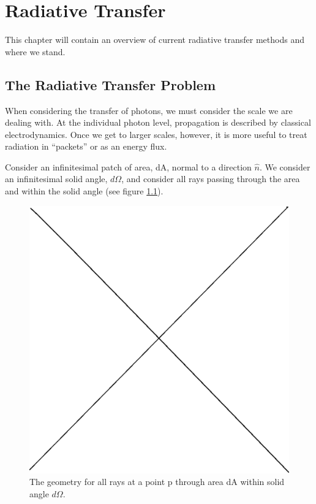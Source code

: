 \pagestyle{fancy}
\headheight 20pt
\chead{}
\lfoot{}
\cfoot{\thepage}
\rfoot{}
\renewcommand{\headrulewidth}{0.1pt}
\renewcommand{\footrulewidth}{0.1pt}

\chapter{Radiative Transfer}
\label{chap:radtransfer}

\thispagestyle{fancy}

This chapter will contain an overview of current radiative transfer methods and where we stand.

\section{The Radiative Transfer Problem}
\label{sec:rtformulation}

When considering the transfer of photons, we must consider the scale we are dealing with. At the individual photon level, propagation is described by classical electrodynamics. Once we get to larger scales, however, it is more useful to treat radiation in ``packets'' or as an energy flux.

Consider an infinitesimal patch of area, dA, normal to a direction $\hat{n}$. We consider an infinitesimal solid angle, $d\Omega$, and consider all rays passing through the area and within the solid angle (see figure \ref{fig:intensity}).

\begin{figure}
\includegraphics[width=\textwidth]{graphics/placeholder.eps}
\caption{The geometry for all rays at a point p through area dA within solid angle $d\Omega$.}
\label{fig:intensity}
\end{figure}

